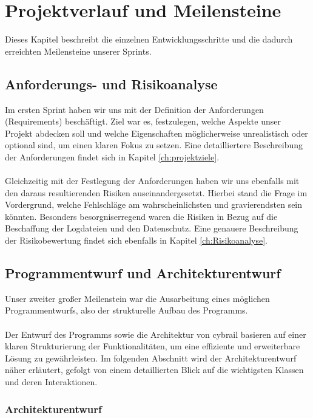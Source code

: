 \chapter{Projektverlauf und Meilensteine} \label{ch:projektverlauf}
Dieses Kapitel beschreibt die einzelnen Entwicklungsschritte und die dadurch erreichten Meilensteine unserer Sprints.

\section{Anforderungs- und Risikoanalyse}
Im ersten Sprint haben wir uns mit der Definition der Anforderungen (Requirements) beschäftigt. 
Ziel war es, festzulegen, welche Aspekte unser Projekt abdecken soll und welche Eigenschaften möglicherweise unrealistisch oder optional sind, um einen klaren Fokus zu setzen. 
Eine detailliertere Beschreibung der Anforderungen findet sich in Kapitel \ref{ch:projektziele}.\\
\\
Gleichzeitig mit der Festlegung der Anforderungen haben wir uns ebenfalls mit den daraus resultierenden Risiken auseinandergesetzt. 
Hierbei stand die Frage im Vordergrund, welche Fehlschläge am wahrscheinlichsten und gravierendsten sein könnten. 
Besonders besorgniserregend waren die Risiken in Bezug auf die Beschaffung der Logdateien und den Datenschutz. 
Eine genauere Beschreibung der Risikobewertung findet sich ebenfalls in Kapitel \ref{ch:Risikoanalyse}.

\section{Programmentwurf und Architekturentwurf}
Unser zweiter großer Meilenstein war die Ausarbeitung eines möglichen Programmentwurfs, also der strukturelle Aufbau des Programms.\\
\\
Der Entwurf des Programms sowie die Architektur von \gls{cybrail} basieren auf einer klaren Strukturierung der Funktionalitäten, um eine effiziente und erweiterbare Lösung zu gewährleisten. 
Im folgenden Abschnitt wird der Architekturentwurf näher erläutert, gefolgt von einem detaillierten Blick auf die wichtigsten Klassen und deren Interaktionen.

\subsection{Architekturentwurf}

